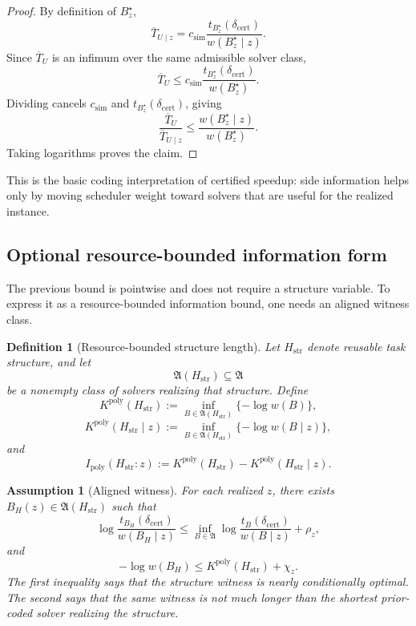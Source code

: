 \documentclass{article}
\newtheorem{assumption}{Assumption}
\newtheorem{definition}{Definition}
\begin{document}
\begin{proof}
By definition of \(B_z^\star\),
\[
    \overline T_{U\mid z}
    =
    c_{\mathrm{sim}}
    \frac{t_{B_z^\star}(\delta_{\mathrm{cert}})}
         {w(B_z^\star\mid z)}.
\]
Since \(\overline T_U\) is an infimum over the same admissible solver class,
\[
    \overline T_U
    \le
    c_{\mathrm{sim}}
    \frac{t_{B_z^\star}(\delta_{\mathrm{cert}})}
         {w(B_z^\star)}.
\]
Dividing cancels \(c_{\mathrm{sim}}\) and \(t_{B_z^\star}(\delta_{\mathrm{cert}})\), giving
\[
    \frac{\overline T_U}{\overline T_{U\mid z}}
    \le
    \frac{w(B_z^\star\mid z)}{w(B_z^\star)}.
\]
Taking logarithms proves the claim.
\end{proof}

This is the basic coding interpretation of certified speedup: side information helps only
by moving scheduler weight toward solvers that are useful for the realized instance.

\subsection{Optional resource-bounded information form}

The previous bound is pointwise and does not require a structure variable.
To express it as a resource-bounded information bound, one needs an aligned witness class.

\begin{definition}[Resource-bounded structure length]
\label{def:app-ipoly}
Let \(H_{\mathrm{str}}\) denote reusable task structure, and let
\[
    \mathfrak A(H_{\mathrm{str}})\subseteq \mathfrak A
\]
be a nonempty class of solvers realizing that structure.  Define
\[
    K^{\mathrm{poly}}(H_{\mathrm{str}})
    :=
    \inf_{B\in\mathfrak A(H_{\mathrm{str}})}
    \{-\log w(B)\},
\]
\[
    K^{\mathrm{poly}}(H_{\mathrm{str}}\mid z)
    :=
    \inf_{B\in\mathfrak A(H_{\mathrm{str}})}
    \{-\log w(B\mid z)\},
\]
and
\[
    I_{\mathrm{poly}}(H_{\mathrm{str}}:z)
    :=
    K^{\mathrm{poly}}(H_{\mathrm{str}})
    -
    K^{\mathrm{poly}}(H_{\mathrm{str}}\mid z).
\]
\end{definition}

\begin{assumption}[Aligned witness]
\label{ass:app-aligned-witness}
For each realized \(z\), there exists
\(B_H(z)\in\mathfrak A(H_{\mathrm{str}})\) such that
\[
    \log\frac{t_{B_H}(\delta_{\mathrm{cert}})}{w(B_H\mid z)}
    \le
    \inf_{B\in\mathfrak A}
    \log\frac{t_B(\delta_{\mathrm{cert}})}{w(B\mid z)}
    +
    \rho_z,
\]
and
\[
    -\log w(B_H)
    \le
    K^{\mathrm{poly}}(H_{\mathrm{str}})+\chi_z.
\]
The first inequality says that the structure witness is nearly conditionally optimal.
The second says that the same witness is not much longer than the shortest prior-coded
solver realizing the structure.
\end{assumption}
\end{document}
